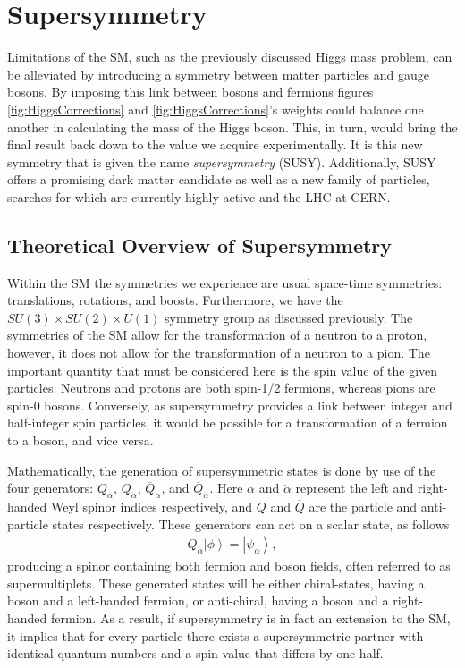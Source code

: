 \section{Supersymmetry}
Limitations of the SM, such as the previously discussed Higgs mass problem, can be alleviated by introducing a symmetry between matter particles and gauge bosons.
By imposing this link between bosons and fermions figures \ref{fig:HiggsCorrections} and \ref{fig:HiggsCorrections}'s weights could balance one another in calculating the mass of the Higgs boson. 
This, in turn, would bring the final result back down to the value we acquire experimentally.
It is this new symmetry that is given the name \textit{supersymmetry} (SUSY).
Additionally, SUSY offers a promising dark matter candidate as well as a new family of particles, searches for which are currently highly active and the LHC at CERN.

\subsection{Theoretical Overview of Supersymmetry}
Within the SM the symmetries we experience are usual space-time symmetries: translations, rotations, and boosts.
Furthermore, we have the $SU(3) \times SU(2) \times U(1)$ symmetry group as discussed previously.
The symmetries of the SM allow for the transformation of a neutron to a proton, however, it does not allow for the transformation of a neutron to a pion.
The important quantity that must be considered here is the spin value of the given particles.
Neutrons and protons are both spin-1/2 fermions, whereas pions are spin-0 bosons.
Conversely, as supersymmetry provides a link between integer and half-integer spin particles, it would be possible for a transformation of a fermion to a boson, and vice versa.

Mathematically, the generation of supersymmetric states is done by use of the four generators: $Q_{\alpha}$, $Q_{\dot{\alpha}}$, $\overline{Q}_{\alpha}$, and $\overline{Q}_{\dot{\alpha}}$. 
Here $\alpha$ and $\dot{\alpha}$ represent the left and right-handed Weyl spinor indices respectively, and $Q$ and $\overline{Q}$ are the particle and anti-particle states respectively.
These generators can act on a scalar state, as follows
\begin{align}
Q_{\alpha} \left| \phi \right> = \left|\psi_{\alpha}\right>,
\end{align}
producing a spinor containing both fermion and boson fields, often referred to as supermultiplets. 
These generated states will be either chiral-states, having a boson and a left-handed fermion, or anti-chiral, having a boson and a right-handed fermion.
As a result, if supersymmetry is in fact an extension to the SM, it implies that for every particle there exists a supersymmetric partner with identical quantum numbers and a spin value that differs by one half.

